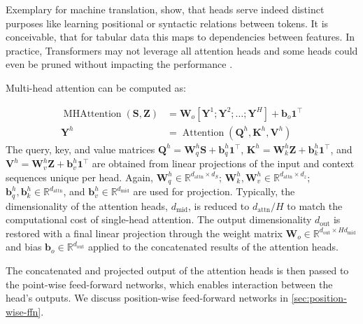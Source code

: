 Exemplary for machine translation, \textcite[][5795]{voitaAnalyzingMultiHeadSelfAttention2019} show, that heads serve indeed distinct purposes like learning positional or syntactic relations between tokens. It is conceivable, that for tabular data this maps to dependencies between features. In practice, Transformers may not leverage all attention heads and some heads could even be pruned without impacting the performance \autocites[][9]{michelAreSixteenHeads2019}[][5805]{voitaAnalyzingMultiHeadSelfAttention2019}.

Multi-head attention can be computed as:

\begin{equation}
    \begin{aligned}
        \operatorname{MHAttention}(\mathbf{S}, \mathbf{Z}) & = \mathbf{W}_{o}\left[\mathbf{Y}^{1};\mathbf{Y}^{2};\ldots;\mathbf{Y}^{H} \right] + \mathbf{b}_{o}\mathbf{1}^{\top} \\
        \mathbf{Y}^{h}                                     & = \operatorname{Attention}(\mathbf{Q}^h, \mathbf{K}^h, \mathbf{V}^h)
    \end{aligned}
\end{equation}
The query, key, and value matrices  $\mathbf{Q}^{h}=\mathbf{W}^h_q \mathbf{S} + \mathbf{b}^h_q\mathbf{1}^{\top}$, $\mathbf{K}^{h}=\mathbf{W}_k^h \mathbf{Z} + \mathbf{b}_k^h\mathbf{1}^{\top}$, and $\mathbf{V}^{h}=\mathbf{W}_v^h \mathbf{Z} + \mathbf{b}_v^h\mathbf{1}^{\top}$ are obtained from linear projections of the input and context sequences unique per head. Again, $\mathbf{W}^{h}_{q} \in \mathbb{R}^{d_{\mathrm{attn}}\times d_{S}}$; $\mathbf{W}^{h}_{k}, \mathbf{W}^{h}_{v} \in \mathbb{R}^{d_{\mathrm{attn}}\times d_z}$; $\mathbf{b}^h_q, \mathbf{b}^h_k \in \mathbb{R}^{d_{\mathrm{attn}}}$, and $\mathbf{b}^h_v \in \mathbb{R}^{d_{\mathrm{mid}}}$ are used for projection. Typically, the dimensionality of the attention heads, $d_{\mathrm{mid}}$, is reduced to $d_{\mathrm{attn}}/H$ to match the computational cost of single-head attention. The output dimensionality $d_{\mathrm{out}}$ is restored with a final linear projection through the weight matrix $\mathbf{W}_{o} \in \mathbb{R}^{d_{\mathrm{out}}\times Hd_{\mathrm{mid}}}$ and bias $\mathbf{b}_o \in \mathbb{R}^{d_{\mathrm{out}}}$ applied to the concatenated results of the attention heads.

The concatenated and projected output of the attention heads is then passed to the point-wise feed-forward networks, which enables interaction between the head's outputs. We discuss position-wise feed-forward networks in \cref{sec:position-wise-ffn}.

